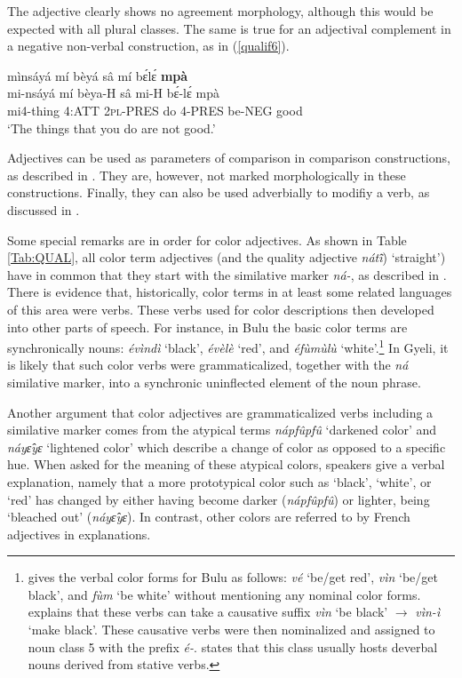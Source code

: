 \noindent The adjective clearly shows no agreement morphology, although this would be expected with all plural classes. The same is true for an adjectival complement in a negative non-verbal construction, as in (\ref{qualif6}).

\begin{exe}
\ex\label{qualif6}
\glll  mìnsáyá mí bèyá sâ mí bɛ́lɛ́ {\bfseries mpà}\\
      mi-nsáyá mí bèya-H sâ mi-H bɛ́-lɛ́ mpà\\
	mi4-thing 4:ATT 2\textsc{pl}-PRES do 4-PRES be-NEG good  \\
    \trans `The things that you do are not good.'
\end {exe}


Adjectives can be used as parameters of comparison in comparison constructions, as described in .  They are, however, not marked morphologically in these constructions. Finally, they can also be used adverbially to modifiy a verb, as discussed in .




Some special remarks are in order for color adjectives. As shown in Table \ref{Tab:QUAL}, all color term adjectives (and the quality adjective {\itshape nátĩ̂}) `straight') have in common that they start with the similative marker {\itshape ná-}, as described in . There is evidence that,  historically, color terms in at least some related languages of this area were verbs. These verbs used for color descriptions then developed into other parts of speech. For instance, in Bulu the basic color terms are synchronically nouns: {\itshape évìndì} `black', {\itshape évèlè} `red', and {\itshape éfùmùlù} `white'.\footnote{\citet{bates04} gives the verbal color forms for Bulu as follows: {\itshape vé} ‘be/get red’, {\itshape vìn} ‘be/get black’, and {\itshape fùm} ‘be white’ without mentioning any nominal color forms. \citet[44]{alexandre55} explains that these verbs can take a causative suffix {\itshape vìn} `be black' $\rightarrow$ {\itshape vìn-ì} `make black'. These causative verbs were then nominalized and assigned to noun class 5 with the prefix {\itshape é-}. \citet[68]{alexandre55} states that this class usually hosts deverbal nouns derived from stative verbs.} In Gyeli, it is likely that such color verbs were grammaticalized, together with the {\itshape ná} similative marker, into a synchronic uninflected element of the noun phrase.

Another argument that color adjectives are grammaticalized verbs including a similative marker comes from the atypical terms {\itshape nápfûpfû} `darkened color' and {\itshape náyɛ̂yɛ} `lightened color' which describe a change of color as opposed to a specific hue. When asked for the meaning of these atypical colors, speakers give a verbal explanation, namely that a more prototypical color such as `black', `white', or `red' has changed by either having become darker ({\itshape nápfûpfû}) or lighter, being `bleached out' ({\itshape náyɛ̂yɛ}). In contrast, other colors are referred to by French adjectives in explanations.

